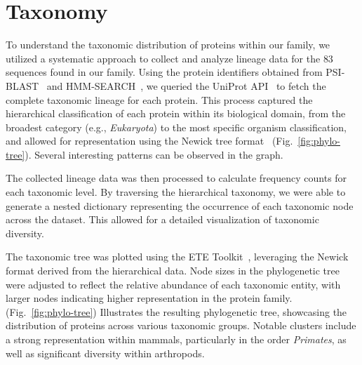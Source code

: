 
\section{Taxonomy}

To understand the taxonomic distribution of proteins within our family, we utilized a systematic approach to collect and analyze lineage data for the $83$ sequences found in our family. Using the protein identifiers obtained from PSI-BLAST~\cite{psiblast} and HMM-SEARCH~\cite{hmmer}, we queried the UniProt API~\cite{uniprot_api} to fetch the complete taxonomic lineage for each protein. This process captured the hierarchical classification of each protein within its biological domain, from the broadest category (e.g., \textit{Eukaryota}) to the most specific organism classification, and allowed for representation using the Newick tree format~\cite{newick_format} (Fig.~\ref{fig:phylo-tree}). Several interesting patterns can be observed in the graph.

The collected lineage data was then processed to calculate frequency counts for each taxonomic level. By traversing the hierarchical taxonomy, we were able to generate a nested dictionary representing the occurrence of each taxonomic node across the dataset. This allowed for a detailed visualization of taxonomic diversity.

The taxonomic tree was plotted using the ETE Toolkit~\cite{ete_toolkit}, leveraging the Newick format derived from the hierarchical data. Node sizes in the phylogenetic tree were adjusted to reflect the relative abundance of each taxonomic entity, with larger nodes indicating higher representation in the protein family. (Fig.~\ref{fig:phylo-tree}) Illustrates the resulting phylogenetic tree, showcasing the distribution of proteins across various taxonomic groups. Notable clusters include a strong representation within mammals, particularly in the order \textit{Primates}, as well as significant diversity within arthropods.


